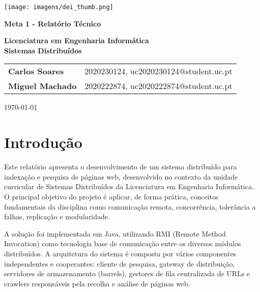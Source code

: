 \documentclass{article}
\begin{document}
\begin{titlepage}
    \centering
    \vspace*{1cm}

    \texttt{[image: imagens/dei\_thumb.png]}

    \vspace{1.5cm}
    {\LARGE \textbf{Meta 1 - Relatório Técnico} \par}
    \vspace{0.5cm}
    \vspace{2.5cm}
    \textbf{Licenciatura em Engenharia Informática} \\
    \textbf{Sistemas Distribuídos}

    \vspace{3cm}
    \begin{tabular}{ll}
        \textbf{Carlos Soares} & 2020230124, uc2020230124@student.uc.pt \\
        \textbf{Miguel Machado} & 2020222874, uc2020222874@student.uc.pt 
    \end{tabular}

    \vfill
    {\large \today \par}
\end{titlepage}



\newpage
\tableofcontents
\newpage



\section{Introdução}

Este relatório apresenta o desenvolvimento de um sistema distribuído para indexação e pesquisa de páginas web, desenvolvido no contexto da unidade curricular de Sistemas Distribuídos da Licenciatura em Engenharia Informática. O principal objetivo do projeto é aplicar, de forma prática, conceitos fundamentais da disciplina como comunicação remota, concorrência, tolerância a falhas, replicação e modularidade.

A solução foi implementada em Java, utilizando RMI (Remote Method Invocation) como tecnologia base de comunicação entre os diversos módulos distribuídos. A arquitetura do sistema é composta por vários componentes independentes e cooperantes: cliente de pesquisa, gateway de distribuição, servidores de armazenamento (barrels), gestores de fila centralizada de URLs e crawlers responsáveis pela recolha e análise de páginas web.
\end{document}
